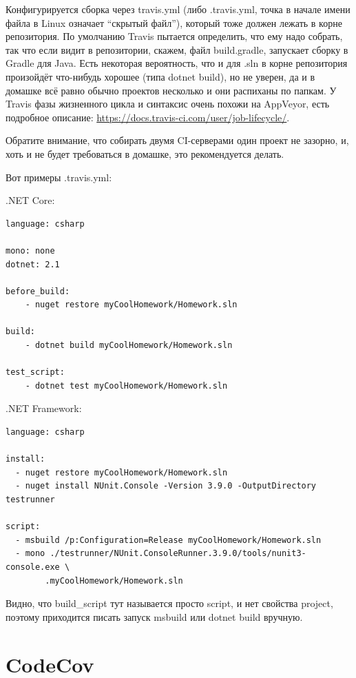 \documentclass[a5paper]{article}
\begin{document}
Конфигурируется сборка через travis.yml (либо .travis.yml, точка в начале имени файла в Linux означает ``скрытый файл''), который тоже должен лежать в корне репозитория. По умолчанию Travis пытается определить, что ему надо собрать, так что если видит в репозитории, скажем, файл build.gradle, запускает сборку в Gradle для Java. Есть некоторая вероятность, что и для .sln в корне репозитория произойдёт что-нибудь хорошее (типа dotnet build), но не уверен, да и в домашке всё равно обычно проектов несколько и они распиханы по папкам. У Travis фазы жизненного цикла и синтаксис очень похожи на AppVeyor, есть подробное описание: \url{https://docs.travis-ci.com/user/job-lifecycle/}.

Обратите внимание, что собирать двумя CI-серверами один проект не зазорно, и, хоть и не будет требоваться в домашке, это рекомендуется делать. 

Вот примеры .travis.yml:

.NET Core:

\begin{verbatim}
language: csharp

mono: none
dotnet: 2.1

before_build: 
    - nuget restore myCoolHomework/Homework.sln

build: 
    - dotnet build myCoolHomework/Homework.sln

test_script: 
    - dotnet test myCoolHomework/Homework.sln
\end{verbatim}

.NET Framework:

\begin{verbatim}
language: csharp

install:
  - nuget restore myCoolHomework/Homework.sln
  - nuget install NUnit.Console -Version 3.9.0 -OutputDirectory testrunner

script:
  - msbuild /p:Configuration=Release myCoolHomework/Homework.sln
  - mono ./testrunner/NUnit.ConsoleRunner.3.9.0/tools/nunit3-console.exe \
        .myCoolHomework/Homework.sln
\end{verbatim}

Видно, что build\_script тут называется просто script, и нет свойства project, поэтому приходится писать запуск msbuild или dotnet build вручную.

\section{CodeCov}
\end{document}
